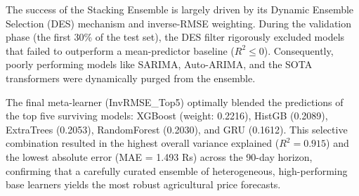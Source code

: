 The success of the Stacking Ensemble is largely driven by its Dynamic Ensemble Selection (DES) mechanism and inverse-RMSE weighting. During the validation phase (the first 30\% of the test set), the DES filter rigorously excluded models that failed to outperform a mean-predictor baseline ($R^2 \leq 0$). Consequently, poorly performing models like SARIMA, Auto-ARIMA, and the SOTA transformers were dynamically purged from the ensemble.

The final meta-learner (InvRMSE\_Top5) optimally blended the predictions of the top five surviving models: XGBoost (weight: 0.2216), HistGB (0.2089), ExtraTrees (0.2053), RandomForest (0.2030), and GRU (0.1612). This selective combination resulted in the highest overall variance explained ($R^2 = 0.915$) and the lowest absolute error (MAE = 1.493 Rs) across the 90-day horizon, confirming that a carefully curated ensemble of heterogeneous, high-performing base learners yields the most robust agricultural price forecasts.

